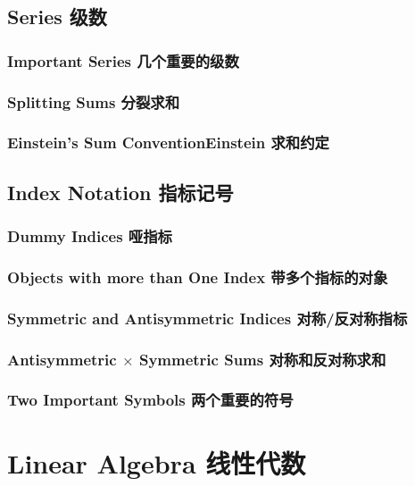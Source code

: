 \section[级数]{Series 级数}\label{appendix.B.4}
\subsection[几个重要的级数]{Important Series 几个重要的级数}\label{appendix.B.4.1}
\subsection[分裂求和]{Splitting Sums 分裂求和}\label{appendix.B.4.2}
\subsection[Einstein 求和约定]{Einstein’s Sum Convention\quad Einstein 求和约定}\label{appendix.B.4.3}

\section[指标记号]{Index Notation 指标记号}\label{appendix.B.5}
\subsection[哑指标]{Dummy Indices 哑指标}\label{appendix.B.5.1}
\subsection[带多个指标的对象]{Objects with more than One Index 带多个指标的对象}\label{appendix.B.5.2}
\subsection[对称/反对称指标]{Symmetric and Antisymmetric Indices 对称/反对称指标}\label{appendix.B.5.3}
\subsection[对称和反对称求和]{Antisymmetric $\times$ Symmetric Sums 对称和反对称求和}\label{appendix.B.5.4}
\subsection[两个重要的符号]{Two Important Symbols 两个重要的符号}\label{appendix.B.5.5}

\chapter[线性代数]{Linear Algebra 线性代数}
